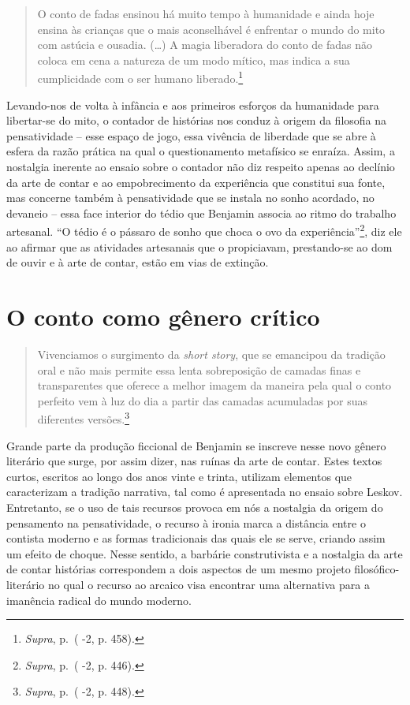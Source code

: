 \begin{quote}
O conto de fadas ensinou há muito tempo à humanidade e ainda hoje ensina
às crianças que o mais aconselhável é enfrentar o mundo do mito com
astúcia e ousadia. (\ldots{}) A magia liberadora do conto de fadas não coloca
em cena a natureza de um modo mítico, mas indica a sua cumplicidade com
o ser humano liberado.\footnote{\emph{Supra}, p.\,\pageref{supra5} ( -2, p. 458).}
\end{quote}

Levando-nos de volta à infância e aos primeiros esforços da humanidade
para libertar-se do mito, o contador de histórias nos conduz à origem da
filosofia na pensatividade -- esse espaço de jogo, essa vivência de
liberdade que se abre à esfera da razão prática na qual o questionamento
metafísico se enraíza. Assim, a nostalgia inerente ao ensaio sobre o
contador não diz respeito apenas ao declínio da arte de contar e ao
empobrecimento da experiência que constitui sua fonte, mas concerne
também à pensatividade que se instala no sonho acordado, no devaneio --
essa face interior do tédio que Benjamin associa ao ritmo do trabalho
artesanal. ``O tédio é o pássaro de sonho que choca o ovo da
experiência''\footnote{\emph{Supra}, p.\,\pageref{supra6} ( -2, p. 446).}, diz ele ao
afirmar que as atividades artesanais que o propiciavam, prestando-se ao
dom de ouvir e à arte de contar, estão em vias de extinção.

\section{O conto como gênero crítico}

\begin{quote}
Vivenciamos o surgimento da \emph{short story}, que se emancipou da
tradição oral e não mais permite essa lenta sobreposição de camadas
finas e transparentes que oferece a melhor imagem da maneira pela qual o
conto perfeito vem à luz do dia a partir das camadas acumuladas por suas
diferentes versões.\footnote{\emph{Supra}, p.\,\pageref{supra7} ( -2, p. 448).}
\end{quote}

Grande parte da produção ficcional de Benjamin se inscreve nesse novo
gênero literário que surge, por assim dizer, nas ruínas da arte de
contar. Estes textos curtos, escritos ao longo dos anos vinte e trinta,
utilizam elementos que caracterizam a tradição narrativa, tal como é
apresentada no ensaio sobre Leskov. Entretanto, se o uso de tais
recursos provoca em nós a nostalgia da origem do pensamento na
pensatividade, o recurso à ironia marca a distância entre o contista
moderno e as formas tradicionais das quais ele se serve, criando assim
um efeito de choque. Nesse sentido, a barbárie construtivista e a
nostalgia da arte de contar histórias correspondem a dois aspectos de um
mesmo projeto filosófico-literário no qual o recurso ao arcaico visa
encontrar uma alternativa para a imanência radical do mundo moderno.

